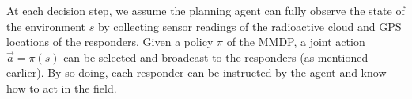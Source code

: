 At each decision step, we assume the planning agent can fully
observe the state of the environment $s$ by collecting sensor
readings of the radioactive cloud and GPS locations of the
responders. Given a policy $\pi$ of the MMDP, a joint action
$\vec{a}=\pi(s)$ can be selected and broadcast to the responders
(as mentioned earlier). By so doing, each responder can be
instructed by the agent and know how to act in the field. 